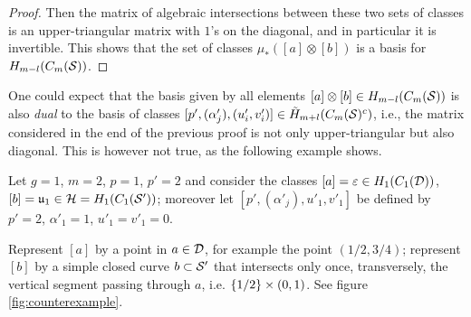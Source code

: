 \begin{proof}
Then the matrix of algebraic intersections between these two sets of
classes is an upper-triangular matrix
with $1$'s on the diagonal, and in particular
it is invertible. This shows that the set of classes $\mu_*([a]\otimes [b])$
is a basis for $H_{m-l}(\cms)$.

% 
% 
% 
% 
% 
% 
% 
\end{proof}

One could expect that the basis given by all elements $[a]\otimes [b]\in H_{m-l}(\cms)$
is also \emph{dual} to the basis of classes $[p',(\alpha'_j),(u'_i,v'_i)]\in \tH_{m+l}(\cms^c)$, i.e., the
matrix considered in the end of the previous proof is not only upper-triangular but also
diagonal. This is however not true, as the following example shows.

Let $g=1$, $m=2$, $p=1$, $p'=2$ and consider the classes $[a]=\epsilon\in H_1(C_1(\D))$,
$[b]=\u_1\in \H=H_1(C_1(\S'))$; moreover let $[p',(\alpha'_j),u'_1,v'_1]$ be defined by
$p'=2$, $\alpha'_1=1$, $u'_1=v'_1=0$.

Represent $[a]$ by a point in $a\in\D$, for example
the point $(1/2,3/4)$; represent $[b]$ by a simple closed curve $b\subset\S'$
that intersects only once, transversely, the vertical segment passing through $a$, i.e.
$\set{1/2}\times(0,1)$. See figure \ref{fig:counterexample}.

